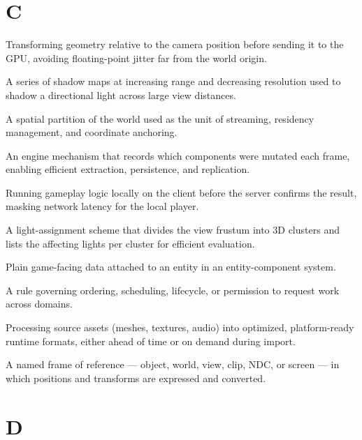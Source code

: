 \documentclass[
  11pt,
  letterpaper,
  DIV=11,
  numbers=noendperiod,
  twoside,
  open=right]{scrreprt}
\providecommand{\tightlist}{%
  \setlength{\itemsep}{0pt}\setlength{\parskip}{0pt}}
\begin{document}
\section*{C}\label{c}


\begin{description}
\tightlist
\item[\textbf{Camera-relative rendering}]
Transforming geometry relative to the camera position before sending it
to the GPU, avoiding floating-point jitter far from the world origin.
\item[\textbf{Cascaded shadow map}]
A series of shadow maps at increasing range and decreasing resolution
used to shadow a directional light across large view distances.
\item[\textbf{Cell}]
A spatial partition of the world used as the unit of streaming,
residency management, and coordinate anchoring.
\item[\textbf{Change tracking}]
An engine mechanism that records which components were mutated each
frame, enabling efficient extraction, persistence, and replication.
\item[\textbf{Client prediction}]
Running gameplay logic locally on the client before the server confirms
the result, masking network latency for the local player.
\item[\textbf{Clustered lighting}]
A light-assignment scheme that divides the view frustum into 3D clusters
and lists the affecting lights per cluster for efficient evaluation.
\item[\textbf{Component}]
Plain game-facing data attached to an entity in an entity-component
system.
\item[\textbf{Control contract}]
A rule governing ordering, scheduling, lifecycle, or permission to
request work across domains.
\item[\textbf{Cooking}]
Processing source assets (meshes, textures, audio) into optimized,
platform-ready runtime formats, either ahead of time or on demand during
import.
\item[\textbf{Coordinate space}]
A named frame of reference --- object, world, view, clip, NDC, or screen
--- in which positions and transforms are expressed and converted.
\end{description}

\section*{D}\label{d}
\end{document}
